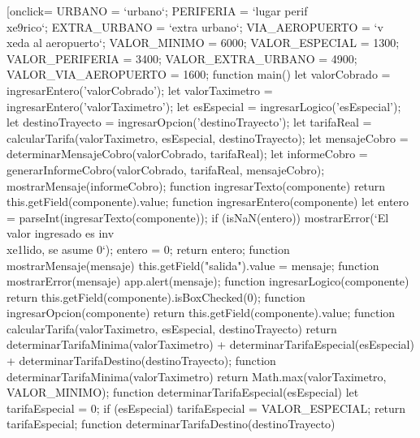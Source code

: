 \documentclass{article}
\begin{document}
{    \begin{Form}
    \PushButton[onclick={
         URBANO               = `urbano`;
         PERIFERIA            = `lugar perif\\xe9rico`;
         EXTRA_URBANO         = `extra urbano`;
         VIA_AEROPUERTO       = `v\\xeda al aeropuerto`;
         VALOR_MINIMO         = 6000;
         VALOR_ESPECIAL       = 1300;
         VALOR_PERIFERIA      = 3400;
         VALOR_EXTRA_URBANO   = 4900;
         VALOR_VIA_AEROPUERTO = 1600;
        function main() {
          let valorCobrado = ingresarEntero('valorCobrado');      
          let valorTaximetro = ingresarEntero('valorTaximetro');
          let esEspecial = ingresarLogico('esEspecial');
          let destinoTrayecto = ingresarOpcion('destinoTrayecto');
          let tarifaReal = calcularTarifa(valorTaximetro, esEspecial, destinoTrayecto);
          let mensajeCobro = determinarMensajeCobro(valorCobrado, tarifaReal);
          let informeCobro = generarInformeCobro(valorCobrado, tarifaReal, mensajeCobro);
          mostrarMensaje(informeCobro);
        }
        function ingresarTexto(componente) {
            return this.getField(componente).value;
          }
        function ingresarEntero(componente) {          
            let entero = parseInt(ingresarTexto(componente));
            if (isNaN(entero)) {
              mostrarError(`El valor ingresado es inv\\xe1lido, se asume 0`);
              entero = 0;
            }
            return entero;
          }
        function mostrarMensaje(mensaje) {
						this.getField("salida").value = mensaje;
					}
        function mostrarError(mensaje) {
          app.alert(mensaje);
        }
				function ingresarLogico(componente) {
						return this.getField(componente).isBoxChecked(0);
					}
        function ingresarOpcion(componente) {
          return this.getField(componente).value;
        }
        function calcularTarifa(valorTaximetro, esEspecial, destinoTrayecto) {
          return determinarTarifaMinima(valorTaximetro) + determinarTarifaEspecial(esEspecial) + determinarTarifaDestino(destinoTrayecto);
        }
        function determinarTarifaMinima(valorTaximetro)  {
          return Math.max(valorTaximetro, VALOR_MINIMO);
        }
        function determinarTarifaEspecial(esEspecial) {
          let tarifaEspecial = 0;
          if (esEspecial) {
            tarifaEspecial = VALOR_ESPECIAL;
          }
          return tarifaEspecial;
        }
        function determinarTarifaDestino(destinoTrayecto) {
}}
\end{Form}}
\end{document}
